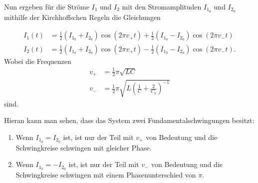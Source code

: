 Nun ergeben für die Ströme $I_1$ und $I_2$ mit den Stromamplituden $I_{1_0}$ und $I_{2_0}$ mithilfe der Kirchhoffschen Regeln die Gleichungen

\begin{align}
    \label{eq:strom}
    I_1(t) &= \frac{1}{2} (I_{1_0} + I_{2_0})\cos(2 \pi v_+ t) + \frac{1}{2} (I_{1_0} - I_{2_0})\cos(2 \pi v_- t) \\
    I_2(t) &= \frac{1}{2} (I_{1_0} + I_{2_0})\cos(2 \pi v_+ t) - \frac{1}{2} (I_{1_0} - I_{2_0})\cos(2 \pi v_- t).
\end{align}
Wobei die Frequenzen
\begin{align}
    \label{eq:frequenzen}
    v_+ &= \frac{1}{2} \pi \sqrt{L C} \\
    v_- &= \frac{1}{2} \pi \sqrt{L \left( \frac{1}{C} + \frac{2}{C_k} \right)^{-1}}
\end{align}
sind.\cite{V355}

Hieran kann man sehen, dass das System zwei Fundamentalschwingungen besitzt:
\begin{enumerate}
\item Wenn $I_{1_0} = I_{2_0}$ ist, ist nur der Teil mit $v_+$ von Bedeutung und die Schwingkreise schwingen mit gleicher Phase.
\item Wenn $I_{1_0} = - I_{2_0}$ ist, ist nur der Teil mit $v_-$ von Bedeutung und die Schwingkreise schwingen mit einem Phasenunterschied von $\pi$.
\end{enumerate}


